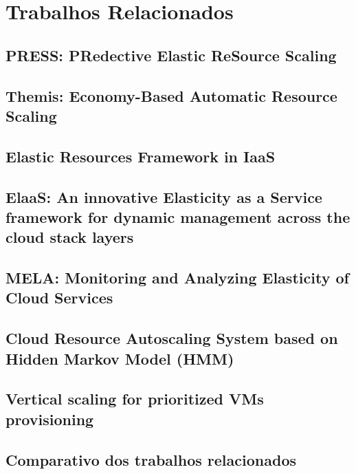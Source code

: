 \documentclass[twoside,english,brazilian]{UNISINOSmonografia}
\begin{document}
\chapter{Trabalhos Relacionados}

\section{PRESS: PRedective Elastic ReSource Scaling}

\section{Themis: Economy-Based Automatic Resource Scaling}

\section{Elastic Resources Framework in IaaS}

\section{ElaaS: An innovative Elasticity as a Service framework for dynamic management across the cloud stack layers}

\section{MELA: Monitoring and Analyzing Elasticity of Cloud Services}

\section{Cloud Resource Autoscaling System based on Hidden Markov Model (HMM)}

\section{Vertical scaling for prioritized VMs provisioning}

\section{Comparativo dos trabalhos relacionados}
\end{document}
